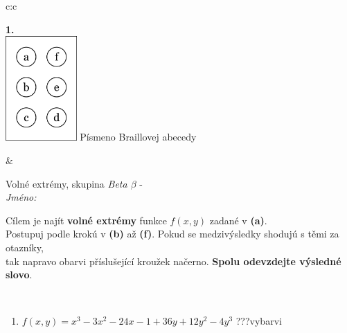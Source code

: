 \documentclass[10pt]{report}
\begin{document}
\begin{tabular}{c:c}
\begin{minipage}[c][104.5mm][t]{0.5\linewidth}
\begin{center}
\begin{minipage}{0.79\linewidth}
\begin{center}
\begin{varwidth}{\linewidth}
\begin{enumerate}
\end{enumerate}
\end{varwidth}
\end{center}
\end{minipage}
\begin{minipage}{0.20\linewidth}
\begin{center}
{\Huge\bfseries 1.} \\[2mm]
\includegraphics[height=40mm]{../images/braille.png}
{\small Písmeno Braillovej abecedy}
\end{center}
\end{minipage}
\end{center}
\end{minipage}
&
\begin{minipage}[c][104.5mm][t]{0.5\linewidth}
\begin{center}
\vspace{7mm}
{\huge Volné extrémy, skupina \textit{Beta $\beta$} -}\\[5mm]
\textit{Jméno:}\phantom{xxxxxxxxxxxxxxxxxxxxxxxxxxxxxxxxxxxxxxxxxxxxxxxxxxxxxxxxxxxxxxxxx}\\[5mm]
\begin{minipage}{0.95\linewidth}
\begin{center}
Cílem je najít \textbf{volné extrémy} funkce $f(x,y)$ zadané v \textbf{(a)}.\\Postupuj podle krokú v \textbf{(b)} až \textbf{(f)}. Pokud se medzivýsledky shodujú s těmi za otazníky,\\tak napravo obarvi příslušející kroužek načerno. \textbf{Spolu odevzdejte výsledné slovo}.
\end{center}
\end{minipage}
\\[1mm]
\begin{minipage}{0.79\linewidth}
\begin{center}
\begin{varwidth}{\linewidth}
\begin{enumerate}
\normalsize
\item $f(x,y)=x^3-3x^2-24x-1+36y+12y^2-4y^3$\quad \dotfill\; ???\;\dotfill \quad vybarvi

\end{enumerate}
\end{varwidth}
\end{center}
\end{minipage}
\end{center}
\end{minipage}
\end{tabular}
\end{document}
